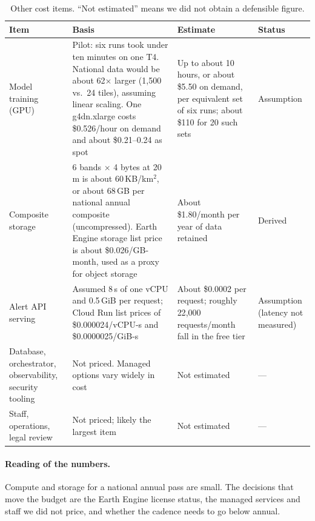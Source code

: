 \documentclass{article}
\begin{document}
\begin{table}[H]
\centering
\caption{Other cost items. ``Not estimated'' means we did not obtain a
defensible figure.}
\label{tab:cost}
\small
\begin{tabular}{p{2.6cm}p{5.4cm}p{3.7cm}p{1.9cm}}
\toprule
Item & Basis & Estimate & Status \\
\midrule
Model training (GPU) &
Pilot: six runs took under ten minutes on one T4. National data would be about
62$\times$ larger (1{,}500 vs.\ 24 tiles), assuming linear scaling. One
g4dn.xlarge costs \$0.526/hour on demand and about \$0.21--0.24 as spot~\cite{g4dn_price} &
Up to about 10 hours, or about \$5.50 on demand, per equivalent set of six runs;
about \$110 for 20 such sets & Assumption \\
Composite storage &
6 bands $\times$ 4 bytes at 20\,m is about 60\,KB/km$^2$, or about 68\,GB per national
annual composite (uncompressed). Earth Engine storage list price is about
\$0.026/GB-month, used as a proxy for object storage &
About \$1.80/month per year of data retained & Derived \\
Alert API serving &
Assumed 8\,s of one vCPU and 0.5\,GiB per request; Cloud Run list prices of
\$0.000024/vCPU-s and \$0.0000025/GiB-s~\cite{cloudrun_pricing} &
About \$0.0002 per request; roughly 22{,}000 requests/month fall in the free tier &
Assumption (latency not measured) \\
Database, orchestrator, observability, security tooling &
Not priced. Managed options vary widely in cost &
Not estimated & --- \\
Staff, operations, legal review &
Not priced; likely the largest item &
Not estimated & --- \\
\bottomrule
\end{tabular}
\end{table}

\paragraph{Reading of the numbers.}
Compute and storage for a national annual pass are small. The decisions that
move the budget are the Earth Engine license status, the managed services and
staff we did not price, and whether the cadence needs to go below annual.
\end{document}
